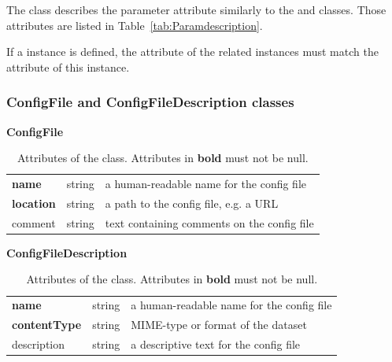 The  class describes the parameter  attribute similarly to the  and  classes. Those attributes are listed in Table~\ref{tab:Paramdescription}.

If a  instance is defined, the  attribute of the related  instances must match the  attribute of this  instance.


\subsubsection{ConfigFile and ConfigFileDescription classes}

\begin{table}[ht]
\small
{}\textwidth
 \textbf{\normalsize ConfigFile}\vspace{0.25em}\\
 \begin{tabulary}{1.0\textwidth}{llL}
 \toprule
  &    & \\
 \midrule
\textbf{name} &  string & a human-readable name for the config file \\
\textbf{location} & string  &  a path to the config file, e.g. a URL \\
comment & string  & text containing comments on the config file  \\
\bottomrule
\end{tabulary}
\caption[Attributes of the  class]{Attributes of the  class. Attributes in \textbf{bold} must not be null.}
\label{tab:configfile}
\end{table}

\begin{table}[ht]
\small
{}\textwidth
\textbf{\normalsize ConfigFileDescription}\vspace{0.25em}\\
\begin{tabulary}{1.0\textwidth}{llL}
 \toprule
  &    & \\
 \midrule
\textbf{name}    & string & a human-readable name for the config file \\
\textbf{contentType}  & string  & MIME-type or format of the dataset \\
description     & string  & a descriptive text for the config file \\
\bottomrule
\end{tabulary}
\caption[Attributes of the  class]{Attributes of the   class. Attributes in \textbf{bold} must not be null.}
\label{tab:configfiledescription}
\end{table}

